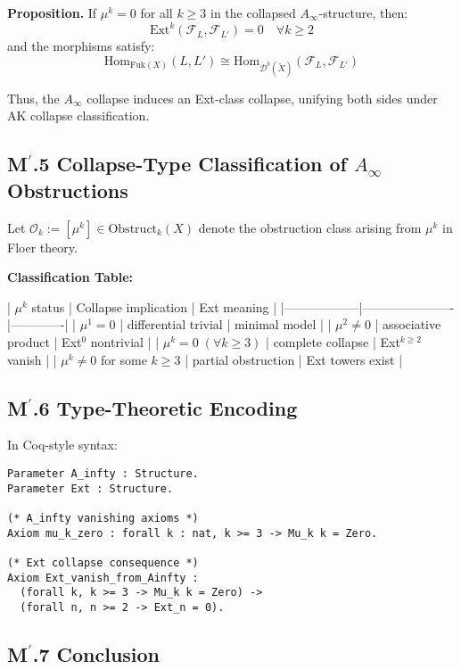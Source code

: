 \documentclass[11pt]{article}
\begin{document}
\begin{axiom}
\begin{axiom}
{{\textbf{Proposition.}  
If \( \mu^k = 0 \) for all \( k \geq 3 \) in the collapsed \( A_\infty \)-structure, then:
\[
\mathrm{Ext}^k(\mathcal{F}_L, \mathcal{F}_{L'}) = 0 \quad \forall k \geq 2
\]
and the morphisms satisfy:
\[
\mathrm{Hom}_{\mathrm{Fuk}(X)}(L, L') \cong \mathrm{Hom}_{\mathcal{D}^b(\check{X})}(\mathcal{F}_L, \mathcal{F}_{L'})
\]

Thus, the \( A_\infty \) collapse induces an Ext-class collapse, unifying both sides under AK collapse classification.

\subsection*{M$^\prime$.5 Collapse-Type Classification of $A_\infty$ Obstructions}

Let \( \mathcal{O}_k := [\mu^k] \in \mathrm{Obstruct}_k(X) \) denote the obstruction class arising from \( \mu^k \) in Floer theory.

\textbf{Classification Table:}

| \( \mu^k \) status | Collapse implication | Ext meaning |
|------------------|----------------------|-------------|
| \( \mu^1 = 0 \) | differential trivial | minimal model |
| \( \mu^2 \neq 0 \) | associative product | Ext$^0$ nontrivial |
| \( \mu^k = 0\; (\forall k \geq 3) \) | complete collapse | Ext$^{k \geq 2}$ vanish |
| \( \mu^k \neq 0 \) for some \( k \geq 3 \) | partial obstruction | Ext towers exist |

\subsection*{M$^\prime$.6 Type-Theoretic Encoding}

In Coq-style syntax:

\begin{lstlisting}[language=Coq]
Parameter A_infty : Structure.
Parameter Ext : Structure.

(* A_infty vanishing axioms *)
Axiom mu_k_zero : forall k : nat, k >= 3 -> Mu_k k = Zero.

(* Ext collapse consequence *)
Axiom Ext_vanish_from_Ainfty :
  (forall k, k >= 3 -> Mu_k k = Zero) ->
  (forall n, n >= 2 -> Ext_n = 0).
\end{lstlisting}

\subsection*{M$^\prime$.7 Conclusion}

}}
\end{axiom}
\end{axiom}
\end{document}
